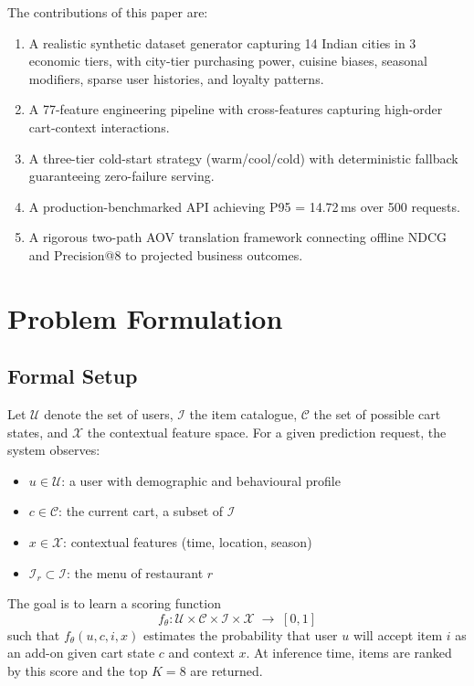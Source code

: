 \documentclass[conference]{IEEEtran}
\begin{document}
The contributions of this paper are:
\begin{enumerate}
  \item A realistic synthetic dataset generator capturing 14 Indian cities in
        3 economic tiers, with city-tier purchasing power, cuisine biases,
        seasonal modifiers, sparse user histories, and loyalty patterns.
  \item A 77-feature engineering pipeline with cross-features capturing
        high-order cart-context interactions.
  \item A three-tier cold-start strategy (warm/cool/cold) with deterministic
        fallback guaranteeing zero-failure serving.
  \item A production-benchmarked API achieving P95 = 14.72\,ms over 500 requests.
  \item A rigorous two-path AOV translation framework connecting offline NDCG
        and Precision@8 to projected business outcomes.
\end{enumerate}


\section{Problem Formulation}

\subsection{Formal Setup}

Let $\mathcal{U}$ denote the set of users, $\mathcal{I}$ the item catalogue,
$\mathcal{C}$ the set of possible cart states, and $\mathcal{X}$ the contextual
feature space. For a given prediction request, the system observes:
\begin{itemize}
  \item $u \in \mathcal{U}$: a user with demographic and behavioural profile
  \item $c \in \mathcal{C}$: the current cart, a subset of $\mathcal{I}$
  \item $x \in \mathcal{X}$: contextual features (time, location, season)
  \item $\mathcal{I}_r \subset \mathcal{I}$: the menu of restaurant $r$
\end{itemize}

The goal is to learn a scoring function
\begin{equation}
  f_\theta : \mathcal{U} \times \mathcal{C} \times \mathcal{I} \times \mathcal{X}
  \;\rightarrow\; [0,1]
\end{equation}
such that $f_\theta(u, c, i, x)$ estimates the probability that user $u$ will
accept item $i$ as an add-on given cart state $c$ and context $x$. At inference
time, items are ranked by this score and the top $K = 8$ are returned.
\end{document}
